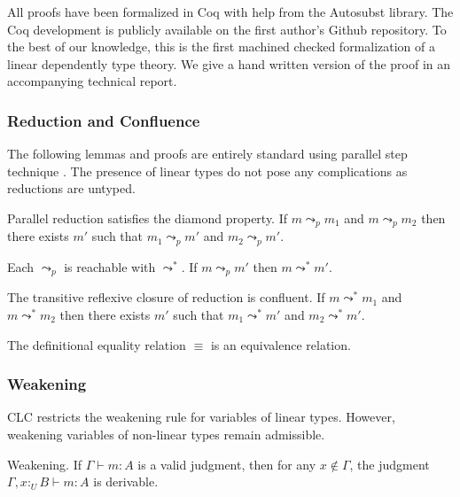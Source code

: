 \documentclass[sigplan,screen,review,anonymous]{acmart}
\newcommand{\utype}{:_{\scriptscriptstyle U}}
\newcommand{\step}{\leadsto}
\newcommand{\pstep}{\leadsto}
\begin{document}
All proofs have been formalized in Coq with help from the Autosubst \cite{autosubst} library. The Coq development is publicly available on the first author's Github repository. To the best of our knowledge, this is the first machined checked formalization of a linear dependently type theory. We give a hand written version of the proof in an accompanying technical report.

\subsubsection{Reduction and Confluence}

The following lemmas and proofs are entirely standard using parallel step technique \cite{takahashi}. The presence of linear types do not pose any complications as reductions are untyped.

\begin{lemma}
  Parallel reduction satisfies the diamond property. If $m \pstep_p m_1$ and $m \pstep_p m_2$ then there exists $m'$ such that $m_1 \pstep_p m'$ and $m_2 \pstep_p m'$.
\end{lemma}

\begin{lemma}
  Each $\pstep_p$ is reachable with $\step^*$. If $m \pstep_p m'$ then $m \step^* m'$.
\end{lemma}

\begin{theorem}
  The transitive reflexive closure of reduction is confluent. If $m \step^* m_1$ and $m \step^* m_2$ then there exists $m'$ such that $m_1 \pstep^* m'$ and $m_2 \pstep^* m'$.
\end{theorem}

\begin{corollary}
  The definitional equality relation $\equiv$ is an equivalence relation.
\end{corollary}

\subsubsection{Weakening} \label{weakening}
CLC restricts the weakening rule for variables of linear types. However, weakening variables of non-linear types remain admissible.

\begin{lemma}
  Weakening. If $\Gamma \vdash m : A$ is a valid judgment, then for any $x \notin \Gamma$, the judgment $\Gamma, x \utype B \vdash m : A$ is derivable.
\end{lemma}
\end{document}
